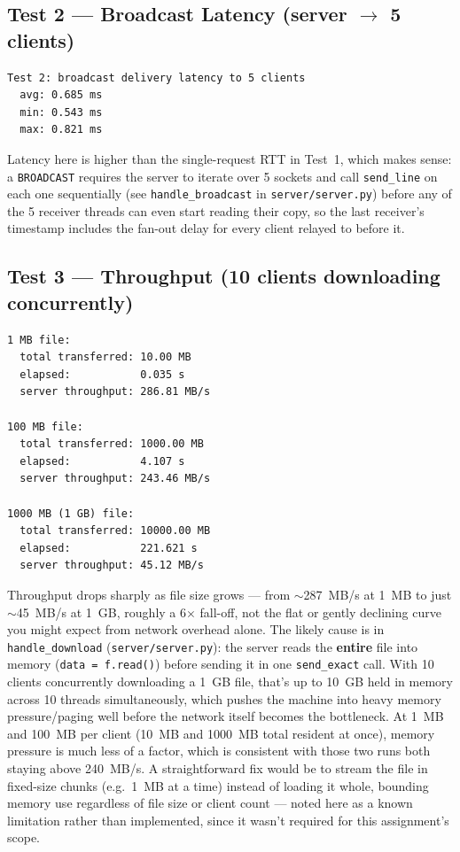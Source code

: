 \documentclass[11pt]{article}
\newcommand{\cmd}[1]{\texttt{#1}}
\begin{document}
\subsection{Test 2 --- Broadcast Latency (server $\to$ 5 clients)}

\begin{verbatim}
Test 2: broadcast delivery latency to 5 clients
  avg: 0.685 ms
  min: 0.543 ms
  max: 0.821 ms
\end{verbatim}

Latency here is higher than the single-request RTT in Test~1, which
makes sense: a \cmd{BROADCAST} requires the server to iterate over 5
sockets and call \cmd{send\_line} on each one sequentially (see
\cmd{handle\_broadcast} in \cmd{server/server.py}) before any of the 5
receiver threads can even start reading their copy, so the last
receiver's timestamp includes the fan-out delay for every client
relayed to before it.

\subsection{Test 3 --- Throughput (10 clients downloading concurrently)}

\begin{verbatim}
1 MB file:
  total transferred: 10.00 MB
  elapsed:           0.035 s
  server throughput: 286.81 MB/s

100 MB file:
  total transferred: 1000.00 MB
  elapsed:           4.107 s
  server throughput: 243.46 MB/s

1000 MB (1 GB) file:
  total transferred: 10000.00 MB
  elapsed:           221.621 s
  server throughput: 45.12 MB/s
\end{verbatim}

Throughput drops sharply as file size grows --- from $\sim$287~MB/s at
1~MB to just $\sim$45~MB/s at 1~GB, roughly a 6$\times$ fall-off, not
the flat or gently declining curve you might expect from network
overhead alone. The likely cause is in \cmd{handle\_download}
(\cmd{server/server.py}): the server reads the \textbf{entire} file
into memory (\cmd{data = f.read()}) before sending it in one
\cmd{send\_exact} call. With 10 clients concurrently downloading a
1~GB file, that's up to 10~GB held in memory across 10 threads
simultaneously, which pushes the machine into heavy memory
pressure/paging well before the network itself becomes the bottleneck.
At 1~MB and 100~MB per client (10~MB and 1000~MB total resident at
once), memory pressure is much less of a factor, which is consistent
with those two runs both staying above 240~MB/s. A straightforward fix
would be to stream the file in fixed-size chunks (e.g.\ 1~MB at a time)
instead of loading it whole, bounding memory use regardless of file
size or client count --- noted here as a known limitation rather than
implemented, since it wasn't required for this assignment's scope.
\end{document}
